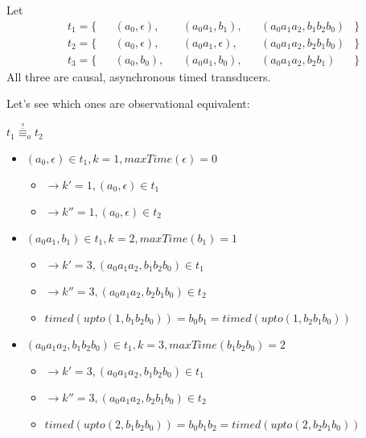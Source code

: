 \begin{exmp}[name=Observational Equivalence]\label{exmp:observational_equivalence}
  Let
  \begin{align*}
    &t_1 = \{&&(a_0, \epsilon),   &&(a_0a_1, b_1),      &&(a_0a_1a_2, b_1b_2b_0)  &\} \\
    &t_2 = \{&&(a_0, \epsilon),   &&(a_0a_1, \epsilon), &&(a_0a_1a_2, b_2b_1b_0)  &\} \\
    &t_3 = \{&&(a_0, b_0),        &&(a_0a_1, b_0),      &&(a_0a_1a_2, b_2b_1)     &\}
  \end{align*}
  All three are causal, asynchronous timed transducers.

  Let's see which ones are observational equivalent:

  \(t_1 \stackrel{?}{\equiv}_o t_2\)
  \begin{itemize}[label={}]
    \item \((a_0, \epsilon)             \in t_1, k = 1, \mathit{maxTime}(\epsilon) = 0\)
      \begin{itemize}[label={}]
        \item \(\rightarrow k' = 1, (a_0, \epsilon)     \in t_1\)
        \item \(\rightarrow k'' = 1, (a_0, \epsilon)     \in t_2\)
      \end{itemize}
    \item \((a_0a_1, b_1)               \in t_1, k = 2, \mathit{maxTime}(b_1) = 1\)
      \begin{itemize}[label={}]
        \item \(\rightarrow k' = 3, (a_0a_1a_2, b_1b_2b_0)    \in t_1\)
        \item \(\rightarrow k'' = 3, (a_0a_1a_2, b_2b_1b_0)    \in t_2\)
        \item \(\mathit{timed}(\mathit{upto}(1, b_1b_2b_0)) = b_0b_1 = \mathit{timed}(\mathit{upto}(1, b_2b_1b_0))\)
      \end{itemize}
    \item \((a_0a_1a_2, b_1b_2b_0)               \in t_1, k = 3, \mathit{maxTime}(b_1b_2b_0) = 2\)
      \begin{itemize}[label={}]
        \item \(\rightarrow k' = 3, (a_0a_1a_2, b_1b_2b_0)    \in t_1\)
        \item \(\rightarrow k'' = 3, (a_0a_1a_2, b_2b_1b_0)    \in t_2\)
        \item \(\mathit{timed}(\mathit{upto}(2, b_1b_2b_0)) = b_0b_1b_2 = \mathit{timed}(\mathit{upto}(2, b_2b_1b_0))\)
      \end{itemize}

\end{itemize}
\end{exmp}
